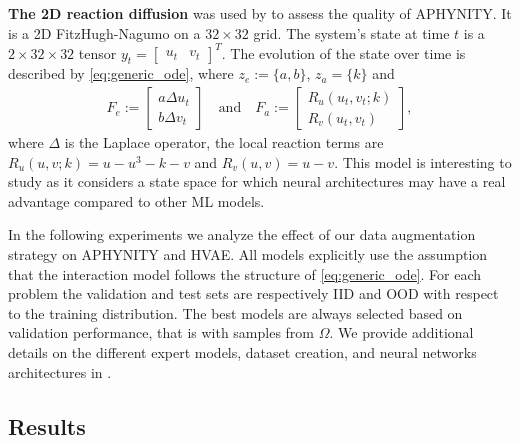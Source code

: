 \textbf{The 2D reaction diffusion} was used by \citet{APHYNITY} to assess the quality of APHYNITY. It is a 2D FitzHugh-Nagumo on a $32 \times 32$ grid. The system's state at time $t$ is a $2\times 32 \times 32$ tensor $y_t = \begin{bmatrix}u_t & v_t\end{bmatrix}^T$. The evolution of the state over time is described by \eqref{eq:generic_ode}, where $z_e:=\{a, b\}$, $z_a= \{k\}$ and
\begin{align}
    F_e := \begin{bmatrix}a \Delta u_t \\ b \Delta v_t \end{bmatrix} \quad \text{and} \quad F_a := \begin{bmatrix}R_u(u_t, v_t;k) \\R_v(u_t, v_t)\end{bmatrix},
\end{align}
where $\Delta$ is the Laplace operator, the local reaction terms are $R_u(u, v;k) = u - u^3 - k -v$ and $R_v(u, v) = u - v$.
This model is interesting to study as it considers a state space for which neural architectures may have a real advantage compared to other ML models.


In the following experiments we analyze the effect of our data augmentation strategy on APHYNITY and HVAE. All models explicitly use the assumption that the interaction model follows the structure of \eqref{eq:generic_ode}. For each problem the validation and test sets are respectively IID and OOD with respect to the training distribution. The best models are always selected based on validation performance, that is with samples from $\Omega$. We provide additional details on the different expert models, dataset creation, and neural networks architectures in .

\subsection{Results}
